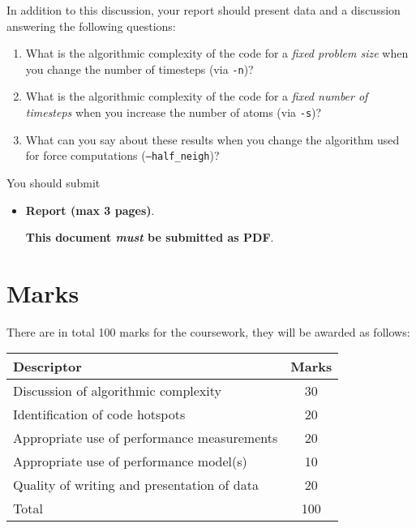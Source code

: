 \documentclass[a4paper]{article}
\begin{document}
In addition to this discussion, your report should present data and a
discussion answering the following questions:
\begin{enumerate}
\item What is the algorithmic complexity of the code for a \emph{fixed
    problem size} when you change the number of timesteps (via
  \texttt{-n})?
\item What is the algorithmic complexity of the code for a \emph{fixed
    number of timesteps} when you increase the number of atoms (via
  \texttt{-s})?
\item What can you say about these results when you change the
  algorithm used for force computations (\texttt{--half\_neigh})?
\end{enumerate}

You should submit
\begin{itemize}
\item \textbf{Report (max 3 pages)}.

  \textbf{This document \emph{must} be submitted as PDF}.
\end{itemize}

\pagebreak
\section{Marks}
\label{sec:marks}

There are in total 100 marks for the coursework, they
will be awarded as follows:
\begin{center}
  \renewcommand\tabularxcolumn[1]{m{#1}}
  \begin{tabularx}{0.9\linewidth}{Xc}
    \toprule
    Descriptor                                                  & Marks \\
    \midrule
    Discussion of algorithmic complexity                        & 30    \\
    Identification of code hotspots                             & 20    \\
    Appropriate use of performance measurements                 & 20    \\
    Appropriate use of performance model(s)                     & 10    \\
    \midrule
    Quality of writing and presentation of data                 & 20    \\
    \midrule
    Total                                                       & 100   \\
    \bottomrule
  \end{tabularx}
\end{center}
\end{document}
